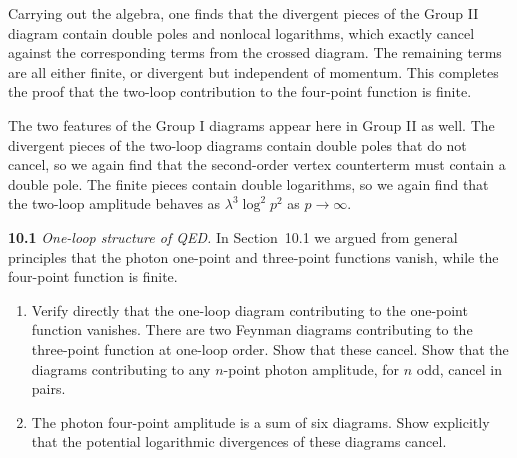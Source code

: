 Carrying out the algebra, one finds that the divergent pieces of the Group II
diagram contain double poles and nonlocal logarithms, which exactly cancel
against the corresponding terms from the crossed diagram.  The remaining terms
are all either finite, or divergent but independent of momentum.  This
completes the proof that the two-loop contribution to the four-point function
is finite.

The two features of the Group I diagrams appear here in Group II as well.
The divergent pieces of the two-loop diagrams contain double poles that do not
cancel, so we again find that the second-order vertex counterterm must contain
a double pole.  The finite pieces contain double logarithms, so we again find
that the two-loop amplitude behaves as $\lambda^3\log^2 p^2$ as
$p\to\infty$.

\problems

\textbf{10.1} \emph{One-loop structure of QED.}  In Section~10.1 we argued
from general principles that the photon one-point and three-point functions
vanish, while the four-point function is finite.
\begin{enumerate}[label=(\alph*)]
  \item Verify directly that the one-loop diagram contributing to the
    one-point function vanishes.  There are two Feynman diagrams contributing
    to the three-point function at one-loop order.  Show that these cancel.
    Show that the diagrams contributing to any $n$-point photon amplitude, for
    $n$ odd, cancel in pairs.
  \item The photon four-point amplitude is a sum of six diagrams.  Show
    explicitly that the potential logarithmic divergences of these diagrams
    cancel.
\end{enumerate}

